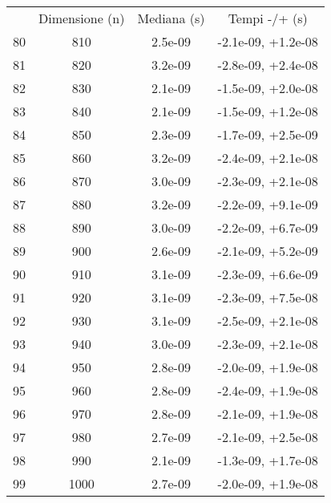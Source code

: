 \begin{table}
\centering
\begin{adjustbox}{width=1\textwidth/2}
\begin{tabular}{|c|c|c|c|}
\hline
 & Dimensione (n) & Mediana (s) & Tempi -/+ (s) \\
80 & 810 & 2.5e-09 & -2.1e-09, +1.2e-08 \\
\cline{1-4}
81 & 820 & 3.2e-09 & -2.8e-09, +2.4e-08 \\
\cline{1-4}
82 & 830 & 2.1e-09 & -1.5e-09, +2.0e-08 \\
\cline{1-4}
83 & 840 & 2.1e-09 & -1.5e-09, +1.2e-08 \\
\cline{1-4}
84 & 850 & 2.3e-09 & -1.7e-09, +2.5e-09 \\
\cline{1-4}
85 & 860 & 3.2e-09 & -2.4e-09, +2.1e-08 \\
\cline{1-4}
86 & 870 & 3.0e-09 & -2.3e-09, +2.1e-08 \\
\cline{1-4}
87 & 880 & 3.2e-09 & -2.2e-09, +9.1e-09 \\
\cline{1-4}
88 & 890 & 3.0e-09 & -2.2e-09, +6.7e-09 \\
\cline{1-4}
89 & 900 & 2.6e-09 & -2.1e-09, +5.2e-09 \\
\cline{1-4}
90 & 910 & 3.1e-09 & -2.3e-09, +6.6e-09 \\
\cline{1-4}
91 & 920 & 3.1e-09 & -2.3e-09, +7.5e-08 \\
\cline{1-4}
92 & 930 & 3.1e-09 & -2.5e-09, +2.1e-08 \\
\cline{1-4}
93 & 940 & 3.0e-09 & -2.3e-09, +2.1e-08 \\
\cline{1-4}
94 & 950 & 2.8e-09 & -2.0e-09, +1.9e-08 \\
\cline{1-4}
95 & 960 & 2.8e-09 & -2.4e-09, +1.9e-08 \\
\cline{1-4}
96 & 970 & 2.8e-09 & -2.1e-09, +1.9e-08 \\
\cline{1-4}
97 & 980 & 2.7e-09 & -2.1e-09, +2.5e-08 \\
\cline{1-4}
98 & 990 & 2.1e-09 & -1.3e-09, +1.7e-08 \\
\cline{1-4}
99 & 1000 & 2.7e-09 & -2.0e-09, +1.9e-08 \\
\cline{1-4}
\end{tabular}
\end{adjustbox}
\end{table}


